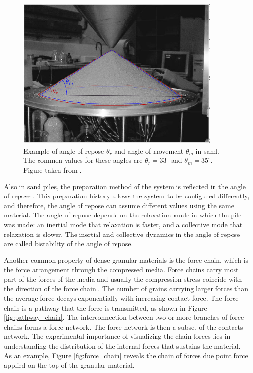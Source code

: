 \begin{figure}[H]
    \centering
    \includegraphics[width=0.9\textwidth]{04-figuras/Sand_Pile_GG_Experiment_Angles.png}
    \caption[Angle of repose and angle of movement.]{Example of angle of repose $\theta _r$ and angle of movement $\theta _m$ in sand. The common values for these angles are $\theta _r = 33^{\circ}$ and $\theta _m = 35^{\circ}$. Figure taken from \cite{Memories_in_Sand}.}
    \label{fig:angulo_repouso}
\end{figure}

    Also in sand piles, the preparation method of the system is reflected in the angle of repose \cite{Dynamics_at_the_angle_of_repose}. This preparation history allows the system to be configured differently, and therefore, the angle of repose can assume different values using the same material. The angle of repose depends on the relaxation mode in which the pile was made: an inertial mode that relaxation is faster, and a collective mode that relaxation is slower. The inertial and collective dynamics in the angle of repose are called bistability of the angle of repose.

    Another common property of dense granular materials is the force chain, which is the force arrangement through the compressed media. Force chains carry most part of the forces of the media and usually the compression stress coincide with the direction of the force chain \cite{Characterization_of_force_chains_in_granular_material, Granular_and_Complex_Materials}. The number of grains carrying larger forces than the average force decays exponentially with increasing contact force. The force chain is a pathway that the force is transmitted, as shown in Figure \ref{fig:pathway_chain}. The interconnection between two or more branches of force chains forms a force network. The force network is then a subset of the contacts network. The experimental importance of visualizing the chain forces lies in understanding the distribution of the internal forces that sustains the material. As an example, Figure \ref{fig:force_chain} reveals the chain of forces due point force applied on the top of the granular material.

